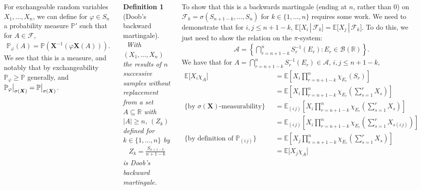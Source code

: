 \documentclass{tikzposter} %
\newcommand\restr[2]{{%
  \left.\kern-\nulldelimiterspace %
  #1 %
  \vphantom{\big|} %
  \right|_{#2} %
  }}
\newtheorem{definition}{Definition}
\begin{document}
\begin{columns}
{{      For exchangeable random variables $X_{1},\dots,X_{n}$, we can define for $\varphi \in S_{n}$ a probability measure $\mathbb{P}'$ such that for $A \in \mathcal{F}$,
      \begin{align*}
        \mathbb{P}_{\varphi}(A) = \mathbb{P}(\bm{X}^{-1}(\varphi\bm{X}(A))).
      \end{align*}
      We see that this is a measure, and notably that by exchangeability $\mathbb{P}_{\varphi} \ge \mathbb{P}$ generally, and $\restr{\mathbb{P}_{\varphi}}{\sigma(\bm{X})} = \restr{\mathbb{P}}{\sigma(\bm{X})}$. \\

      \begin{definition}[Doob's backward martingale]
        \ With $(X_{1},\dots,X_{n})$ the results of $n$ successive samples without replacement from a set $A \subseteq \mathbb{R}$ with $|A| \ge n$, $(Z_{k})$ defined for $k \in \{1,\dots,n\}$ by
        \begin{align*}
          Z_{k} = \frac{S_{n+1-k}}{n+1-k}
        \end{align*}
        is Doob's backward martingale.
      \end{definition}
      \hphantom{}

      To show that this is a backwards martingale (ending at $n$, rather than $0$) on $\mathcal{F}_{k} = \sigma(S_{n+1-k},\dots,S_{n})$ for $k \in \{1,\dots,n\}$ requires some work. We need to demonstrate that for $i, j \le n+1-k$, $\mathbb{E}\big[X_{i} \,|\, \mathcal{F}_{k}\big] = \mathbb{E}\big[X_{j} \,|\, \mathcal{F}_{k}]$. To do this, we just need to show the relation on the $\pi$-system:
      \begin{align*}
        \mathcal{A} = \left\{\bigcap_{r=n+1-k}^{n} S_{r}^{-1}(E_{r}) : E_{r} \in \mathcal{B}(\mathbb{R}) \right\}.
      \end{align*}
      We have that for $A = \bigcap_{r=n+1-k}^{n} S_{r}^{-1}(E_{r}) \in \mathcal{A}$, $i,j \le n+1-k$,
      \begin{align*}
        \mathbb{E}\big[X_{i}\chi_{A}\big] &= \mathbb{E}\left[X_{i} \prod_{r=n+1-k}^{n} \chi_{E_{r}}(S_{r})\right] \\
                                          &= \mathbb{E}\left[X_{i} \prod_{r=n+1-k}^{n} \chi_{E_{r}}\left(\sum_{s = 1}^{r} X_{s}\right)\right] \\
            \text{\{by $\sigma(\bm{X})$-measurability\}} \quad &= \mathbb{E}_{(i\,j)}\left[X_{i} \prod_{r=n+1-k}^{n} \chi_{E_{r}}\left(\sum_{s = 1}^{r} X_{s}\right)\right] \\
            &= \mathbb{E}_{(i\,j)}\left[X_{i} \prod_{r=n+1-k}^{n} \chi_{E_{r}}\left(\sum_{s = 1}^{r} X_{s(i\, j)}\right)\right] \\
           \text{\{by definition of $\mathbb{P}_{(i\,j)}$\}}\quad &= \mathbb{E}\left[X_{j} \prod_{r=n+1-k}^{n} \chi_{E_{r}}\left(\sum_{s=1}^{r}X_{s}\right)\right] \\
        &= \mathbb{E}\big[X_{j} \chi_{A}\big]
      \end{align*}

}}
\end{columns}
\end{document}
